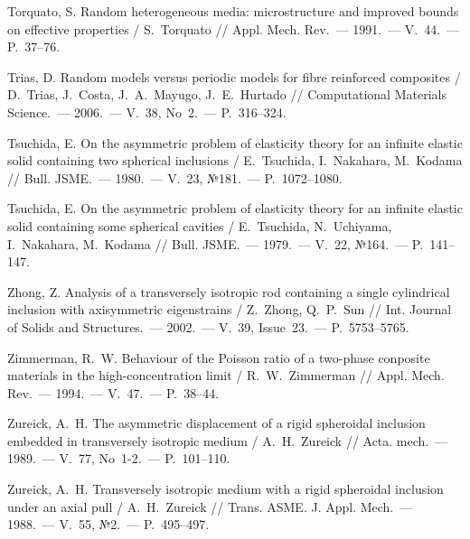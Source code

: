 \begin{biblist}{99}
Torquato, S. 
Random heterogeneous media: microstructure and improved bounds on effective properties  
/ S.~Torquato 
// Appl. Mech. Rev.~--- 1991.~--- V.~44.~--- P.~37--76.

Trias, D. 
Random models versus periodic models for fibre reinforced composites 
/ D.~Trias, J.~Costa, J.~A.~Mayugo, J.~E.~Hurtado 
// Computational Materials Science.~--- 2006.~--- V.~38, No~2.~--- P.~316--324.

Tsuchida, E. On the asymmetric problem of elasticity theory for an infinite elastic solid containing two spherical inclusions 
/ E.~Tsuchida, I.~Nakahara, M.~Kodama 
// Bull. JSME.~--- 1980.~--- V.~23, №181.~--- P.~1072--1080.

Tsuchida, E. 
On the asymmetric problem of elasticity theory for an infinite elastic solid containing some spherical cavities 
/ E.~Tsuchida, N.~Uchiyama, I.~Nakahara, M.~Kodama 
// Bull. JSME.~--- 1979.~--- V.~22, №164.~--- P.~141--147.

Zhong, Z. 
Analysis of a transversely isotropic rod containing a single cylindrical inclusion with axisymmetric eigenstrains 
/ Z.~Zhong, Q.~P.~Sun 
// Int. Journal of Solids and Structures.~--- 2002.~--- V.~39, Issue~23.~--- P.~5753--5765.

Zimmerman, R.~W. 
Behaviour of the Poisson ratio of a two-phase conposite materials in the high-concentration limit  
/ R.~W.~Zimmerman 
// Appl. Mech. Rev.~--- 1994.~--- V.~47.~--- P.~38--44.

Zureick, A.~H. 
The asymmetric displacement of a rigid spheroidal inclusion embedded in transversely isotropic medium 
/ A.~H.~Zureick 
// Acta. mech.~--- 1989.~--- V.~77, No~1-2.~--- P.~101--110.

Zureick, A.~H. 
Transversely isotropic medium with a rigid spheroidal inclusion under an axial pull 
/ A.~H.~Zureick 
// Trans. ASME. J. Appl. Mech.~--- 1988.~--- V.~55, №2.~--- P.~495--497.

\end{biblist}
